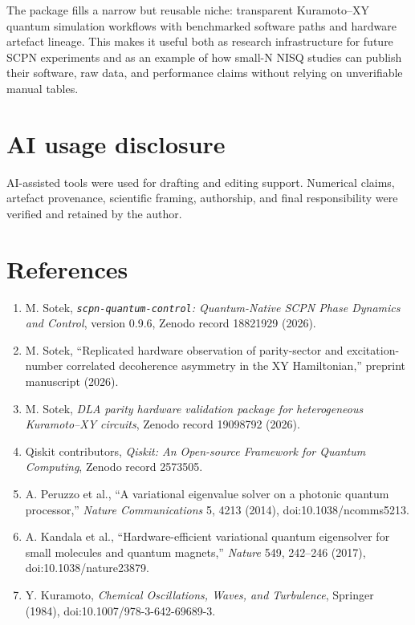 \documentclass[11pt]{article}
\begin{document}
The package fills a narrow but reusable niche: transparent Kuramoto--XY quantum
simulation workflows with benchmarked software paths and hardware artefact
lineage. This makes it useful both as research infrastructure for future SCPN
experiments and as an example of how small-N NISQ studies can publish their
software, raw data, and performance claims without relying on unverifiable
manual tables.

\section*{AI usage disclosure}

AI-assisted tools were used for drafting and editing support. Numerical claims,
artefact provenance, scientific framing, authorship, and final responsibility
were verified and retained by the author.

\section*{References}

\begin{enumerate}[leftmargin=*]
  \item M. Sotek, \emph{\texttt{scpn-quantum-control}: Quantum-Native SCPN Phase Dynamics and Control}, version 0.9.6, Zenodo record 18821929 (2026).
  \item M. Sotek, ``Replicated hardware observation of parity-sector and excitation-number correlated decoherence asymmetry in the XY Hamiltonian,'' preprint manuscript (2026).
  \item M. Sotek, \emph{DLA parity hardware validation package for heterogeneous Kuramoto--XY circuits}, Zenodo record 19098792 (2026).
  \item Qiskit contributors, \emph{Qiskit: An Open-source Framework for Quantum Computing}, Zenodo record 2573505.
  \item A. Peruzzo et al., ``A variational eigenvalue solver on a photonic quantum processor,'' \emph{Nature Communications} 5, 4213 (2014), doi:10.1038/ncomms5213.
  \item A. Kandala et al., ``Hardware-efficient variational quantum eigensolver for small molecules and quantum magnets,'' \emph{Nature} 549, 242--246 (2017), doi:10.1038/nature23879.
  \item Y. Kuramoto, \emph{Chemical Oscillations, Waves, and Turbulence}, Springer (1984), doi:10.1007/978-3-642-69689-3.
\end{enumerate}
\end{document}
